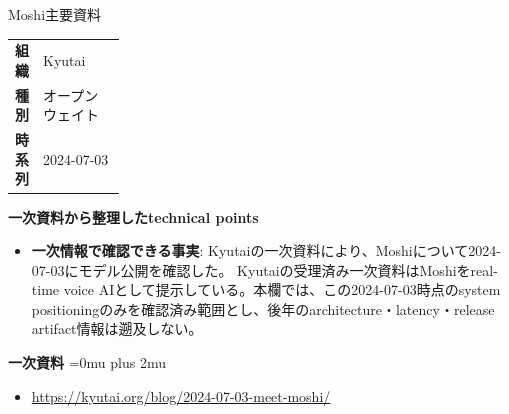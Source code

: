 \begin{technicalnote}{Moshi}{主要資料}
\begingroup
\begin{tabularx}{\linewidth}{@{}>{\bfseries}p{0.22\linewidth}X@{}}
組織 & Kyutai \\
種別 & オープンウェイト \\
時系列 & 2024-07-03 \\
\end{tabularx}
\smallskip
{\bfseries 一次資料から整理したtechnical points}
\begin{itemize}[leftmargin=1.5em,itemsep=0.35em]
\item \textbf{一次情報で確認できる事実}: Kyutaiの一次資料により、Moshiについて2024-07-03にモデル公開を確認した。 Kyutaiの受理済み一次資料はMoshiをreal-time voice AIとして提示している。本欄では、この2024-07-03時点のsystem positioningのみを確認済み範囲とし、後年のarchitecture・latency・release artifact情報は遡及しない。
\end{itemize}
\begin{minipage}{\linewidth}
\begin{samepage}
{\bfseries 一次資料}
\begingroup\sloppy
\Urlmuskip=0mu plus 2mu\relax
\begin{itemize}[leftmargin=1.5em,itemsep=0.25em]
\item {\scriptsize\url{https://kyutai.org/blog/2024-07-03-meet-moshi/}}
\end{itemize}
\endgroup
\end{samepage}
\end{minipage}
\endgroup
\end{technicalnote}
\medskip

